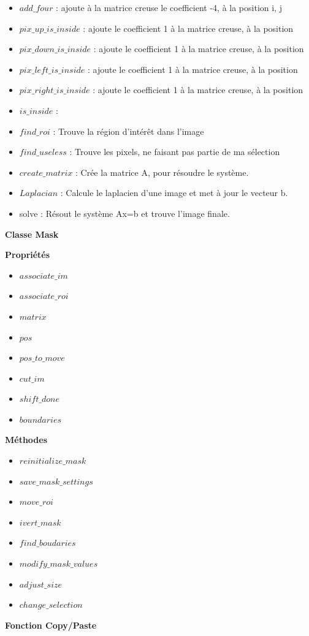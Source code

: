 \begin{itemize}
\item $add\_four$ : ajoute à la matrice creuse le coefficient -4, à la position i, j
\item $pix\_up\_is\_inside$ : ajoute le coefficient 1 à la matrice creuse, à la position
\item $pix\_down\_is\_inside$ : ajoute le coefficient 1 à la matrice creuse, à la position
\item $pix\_left\_is\_inside$ : ajoute le coefficient 1 à la matrice creuse, à la position
\item $pix\_right\_is\_inside$ : ajoute le coefficient 1 à la matrice creuse, à la position
\item $is\_inside$ : 
\item $find\_roi$ :  Trouve la région d'intérêt dans l'image
\item $find\_useless$ : Trouve les pixels, ne faisant pas partie de ma sélection
\item $create\_matrix$  : Crée la matrice A, pour résoudre le système.
\item $Laplacian$ :  Calcule le laplacien d'une image et met à jour le vecteur b.
\item solve :  Résout le système Ax=b et trouve l'image finale.
\end{itemize}

\begin{center}
\textbf{Classe Mask}\\
\end{center}
\textbf{Propriétés}\\
\begin{itemize}
\item $associate\_im$
\item $associate\_roi$
\item $matrix$
\item $pos$
\item $pos\_to\_move$
\item $cut\_im$
\item $shift\_done$
\item $boundaries$
\end{itemize}
\textbf{Méthodes}
\begin{itemize}
\item $reinitialize\_mask$
\item $save\_mask\_settings$
\item $move\_roi$
\item $ivert\_mask$
\item $find\_boudaries$
\item $modify\_mask\_values$
\item $adjust\_size$
\item $change\_selection$
\end{itemize}
\begin{center}
\textbf{Fonction Copy/Paste}
\end{center}
